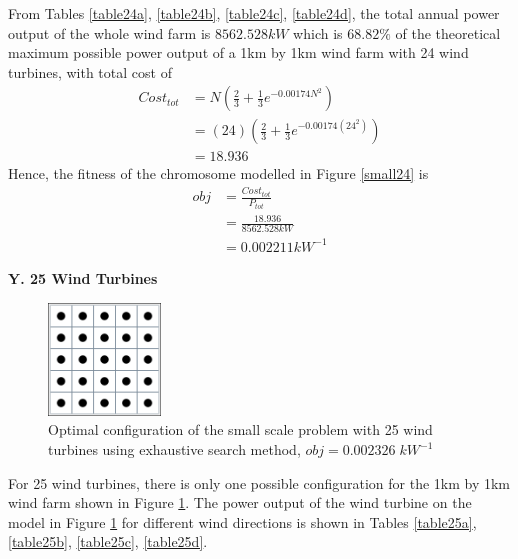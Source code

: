         From Tables \ref{table24a}, \ref{table24b}, \ref{table24c}, \ref{table24d}, the total annual power output of the whole wind farm is $8562.528kW$ which is $68.82\%$ of the theoretical maximum possible power output of a 1km by 1km wind farm with 24 wind turbines, with total cost of
        \begin{align*}
            Cost_{tot}
            &= N\left(\frac{2}{3} + \frac{1}{3}e^{-0.00174N^2}\right) \\
            &= \left(24\right)\left(\frac{2}{3} + \frac{1}{3}e^{-0.00174\left(24^2\right)}\right) \\
            &=18.936
        \end{align*}
        Hence, the fitness of the chromosome modelled in Figure \ref{small24} is
        \begin{align*}
            obj
            &=\frac{Cost_{tot}}{P_{tot}} \\
            &=\frac{18.936}{8562.528kW} \\
            &=0.002211kW^{-1}
        \end{align*}
        
    \textbf{Y. 25 Wind Turbines}
        \begin{figure}[H]
            \centering
            \includegraphics[width=3cm]{Figures/Chromosomes/25.png}
            \caption{Optimal configuration of the small scale problem with 25 wind turbines using exhaustive search method, $obj=0.002326\;kW^{-1}$}
            \label{small25}
        \end{figure}
        
        For 25 wind turbines, there is only one possible configuration for the 1km by 1km wind farm shown in Figure \ref{small25}. The power output of the wind turbine on the model in Figure \ref{small25} for different wind directions is shown in Tables \ref{table25a}, \ref{table25b}, \ref{table25c}, \ref{table25d}.
        
